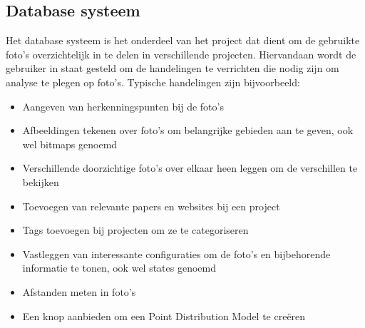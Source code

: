 \subsection{Database systeem}
\label{aanpak_database_systeem}
Het database systeem is het onderdeel van het project dat dient om de gebruikte foto's overzichtelijk in te delen in verschillende projecten. Hiervandaan wordt de gebruiker in staat gesteld om de handelingen te verrichten die nodig zijn om analyse te plegen op foto's. Typische handelingen zijn bijvoorbeeld: 

\begin{itemize}
\item Aangeven van herkenningspunten bij de foto's
\item Afbeeldingen tekenen over foto's om belangrijke gebieden aan te geven, ook wel bitmaps genoemd
\item Verschillende doorzichtige foto's over elkaar heen leggen om de verschillen te bekijken
\item Toevoegen van relevante papers en websites bij een project
\item Tags toevoegen bij projecten om ze te categoriseren
\item Vastleggen van interessante configuraties om de foto's en bijbehorende informatie te tonen, ook wel states genoemd
\item Afstanden meten in foto's
\item Een knop aanbieden om een Point Distribution Model te cre\"{e}ren
\end{itemize}

